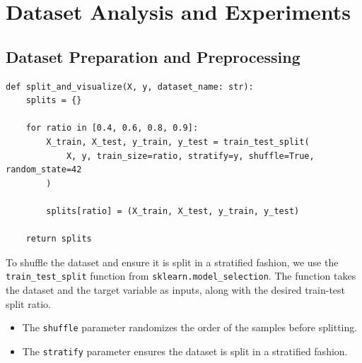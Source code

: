 \section{Dataset Analysis and Experiments}
\subsection{Dataset Preparation and Preprocessing}
\begin{verbatim}
def split_and_visualize(X, y, dataset_name: str):
    splits = {}

    for ratio in [0.4, 0.6, 0.8, 0.9]:
        X_train, X_test, y_train, y_test = train_test_split(
            X, y, train_size=ratio, stratify=y, shuffle=True, random_state=42
        )

        splits[ratio] = (X_train, X_test, y_train, y_test)

    return splits
\end{verbatim}
\begin{flushleft}
	To shuffle the dataset and ensure it is split in a stratified fashion, we use the \texttt{train\_test\_split} function from \texttt{sklearn.model\_selection}. The function takes the dataset and the target variable as inputs, along with the desired train-test split ratio.
	\begin{itemize}
		\item The \texttt{shuffle} parameter randomizes the order of the samples before splitting.
		\item The \texttt{stratify} parameter ensures the dataset is split in a stratified fashion.
	\end{itemize}
\end{flushleft}

